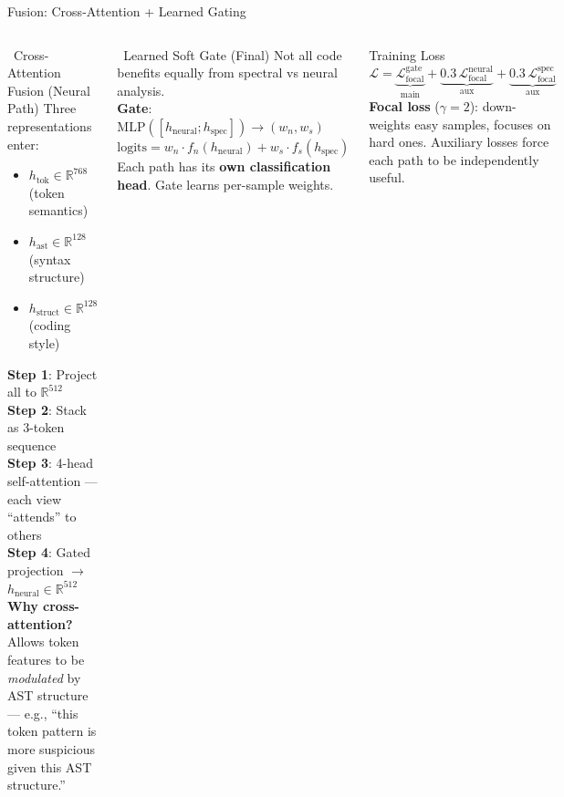 \documentclass[aspectratio=169, 10pt]{beamer}
\begin{document}
\begin{frame}{Fusion: Cross-Attention + Learned Gating}
\vspace{-0.15cm}
\begin{columns}[T]
\begin{block}{\faCogs\ Cross-Attention Fusion (Neural Path)}
\small
Three representations enter:
\begin{itemize}\setlength\itemsep{2pt}
    \item $h_{\text{tok}} \in \mathbb{R}^{768}$ (token semantics)
    \item $h_{\text{ast}} \in \mathbb{R}^{128}$ (syntax structure)
    \item $h_{\text{struct}} \in \mathbb{R}^{128}$ (coding style)
\end{itemize}
\vspace{3pt}
\textbf{Step 1}: Project all to $\mathbb{R}^{512}$\\
\textbf{Step 2}: Stack as 3-token sequence\\
\textbf{Step 3}: 4-head self-attention --- each view ``attends'' to others\\
\textbf{Step 4}: Gated projection $\to$ $h_{\text{neural}} \in \mathbb{R}^{512}$\\[4pt]
{\scriptsize \textbf{Why cross-attention?} Allows token features to be \emph{modulated} by AST structure --- e.g., ``this token pattern is more suspicious given this AST structure.''}
\end{block}

\begin{block}{\faBalanceScale\ Learned Soft Gate (Final)}
\small
Not all code benefits equally from spectral vs neural analysis.\\[4pt]
\textbf{Gate}: $\text{MLP}([h_{\text{neural}}; h_{\text{spec}}]) \to (w_n, w_s)$\\[2pt]
$\text{logits} = w_n \cdot f_n(h_{\text{neural}}) + w_s \cdot f_s(h_{\text{spec}})$\\[6pt]
Each path has its \textbf{own classification head}. Gate learns per-sample weights.
\end{block}

\begin{exampleblock}{\scriptsize Training Loss}
\small
$\mathcal{L} = \underbrace{\mathcal{L}_{\text{focal}}^{\text{gate}}}_{\text{main}} + \underbrace{0.3\,\mathcal{L}_{\text{focal}}^{\text{neural}}}_{\text{aux}} + \underbrace{0.3\,\mathcal{L}_{\text{focal}}^{\text{spec}}}_{\text{aux}}$\\[4pt]
\scriptsize
\textbf{Focal loss} ($\gamma\!=\!2$): down-weights easy samples, focuses on hard ones. Auxiliary losses force each path to be independently useful.
\end{exampleblock}
\end{columns}
\end{frame}
\end{document}
